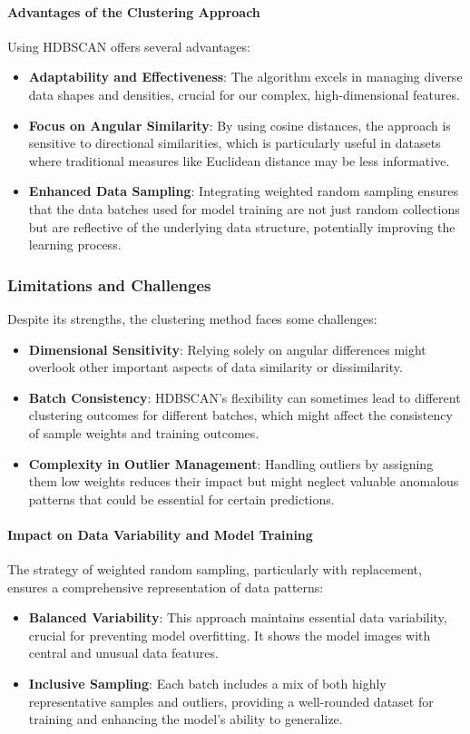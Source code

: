 \paragraph{Advantages of the Clustering Approach}
Using HDBSCAN offers several advantages:
\begin{itemize}
    \item \textbf{Adaptability and Effectiveness}: The algorithm excels in managing diverse data shapes and densities, crucial for our complex, high-dimensional features.
    \item \textbf{Focus on Angular Similarity}: By using cosine distances, the approach is sensitive to directional similarities, which is particularly useful in datasets where traditional measures like Euclidean distance may be less informative.
    \item \textbf{Enhanced Data Sampling}: Integrating weighted random sampling ensures that the data batches used for model training are not just random collections but are reflective of the underlying data structure, potentially improving the learning process.
\end{itemize}

\subsubsection{Limitations and Challenges}
Despite its strengths, the clustering method faces some challenges:
\begin{itemize}
    \item \textbf{Dimensional Sensitivity}: Relying solely on angular differences might overlook other important aspects of data similarity or dissimilarity.
    \item \textbf{Batch Consistency}: HDBSCAN's flexibility can sometimes lead to different clustering outcomes for different batches, which might affect the consistency of sample weights and training outcomes.
    \item \textbf{Complexity in Outlier Management}: Handling outliers by assigning them low weights reduces their impact but might neglect valuable anomalous patterns that could be essential for certain predictions.
\end{itemize}

\paragraph{Impact on Data Variability and Model Training}
The strategy of weighted random sampling, particularly with replacement, ensures a comprehensive representation of data patterns:
\begin{itemize}
    \item \textbf{Balanced Variability}: This approach maintains essential data variability, crucial for preventing model overfitting. It shows the model images with central and unusual data features.
    \item \textbf{Inclusive Sampling}: Each batch includes a mix of both highly representative samples and outliers, providing a well-rounded dataset for training and enhancing the model's ability to generalize.
\end{itemize}

